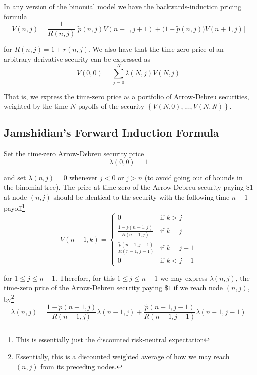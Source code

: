 \documentclass[12pt]{article}
\newlength\tindent
\renewcommand{\indent}{\hspace*{\tindent}}
\begin{document}
In any version of the binomial model we have the backwards-induction pricing formula
\begin{equation*}
	V(n,j) = \frac{1}{R(n,j)} \Big[ \tilde{p}(n,j)V(n + 1, j + 1) + \big(1 - \tilde{p}(n,j) \big)V(n + 1,j) \Big]
\end{equation*}

for $R(n,j) = 1 + r(n,j)$. We also have that the time-zero price of an arbitrary derivative security can be expressed as
\begin{equation*}
	V(0,0) = \sum^N_{j = 0} \lambda(N,j)V(N,j)
\end{equation*}

\indent That is, we express the time-zero price as a portfolio of Arrow-Debreu securities, weighted by the time $N$ payoffs of the security $\left\{V(N, 0),...,V(N, N)\right\}$.

\subsection{Jamshidian's Forward Induction Formula}

Set the time-zero Arrow-Debreu security price
\begin{equation*}
	\lambda(0,0) = 1
\end{equation*}

and set $\lambda(n,j) = 0$ whenever $j < 0$ or $j > n$ (to avoid going out of bounds in the binomial tree). The price at time zero of the Arrow-Debreu security paying $\$1$ at node $(n,j)$ should be identical to the security with the following time $n - 1$ payoff\footnote{This is essentially just the discounted risk-neutral expectation}
\begin{equation*}
	V(n - 1, k) = 
	\begin{cases}
		0 & \text{if } k > j \\
		\frac{ 1 - \tilde{p}(n - 1, j) }{ R(n - 1, j) } & \text{if } k = j \\
		\frac{ \tilde{p}(n - 1, j - 1)}{ R(n - 1, j - 1) } & \text{if } k = j - 1 \\
		0 & \text{if } k < j - 1
	\end{cases}
\end{equation*}

for $1 \leq j \leq n - 1$. Therefore, for this $1 \leq j \leq n - 1$ we may express $\lambda(n, j)$, the time-zero price of the Arrow-Debreu security paying $\$1$ if we reach node $(n,j)$, by\footnote{Essentially, this is a discounted weighted average of how we may reach $(n,j)$ from its preceding nodes.}
\begin{equation*}
	\lambda(n,j) = \frac{ 1 - \tilde{p}(n - 1, j) }{ R(n - 1, j) } \lambda(n - 1, j) + \frac{ \tilde{p}(n - 1, j - 1) }{ R(n - 1, j - 1) }\lambda(n - 1, j - 1)
\end{equation*}
\end{document}

